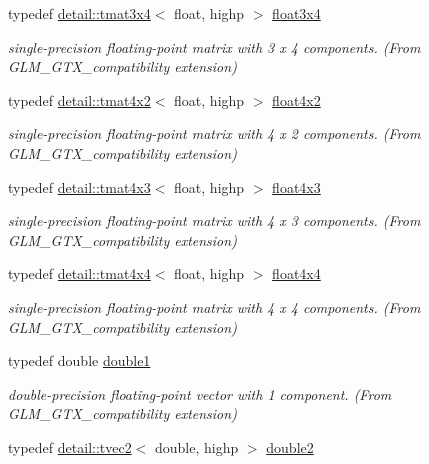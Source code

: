 \begin{DoxyCompactItemize}
typedef \hyperlink{structglm_1_1detail_1_1tmat3x4}{detail\+::tmat3x4}$<$ float, highp $>$ \hyperlink{group__gtx__compatibility_ga53eb75b08b92aa34886397150c983943}{float3x4}
\begin{DoxyCompactList}\small\item\em single-\/precision floating-\/point matrix with 3 x 4 components. (From G\+L\+M\+\_\+\+G\+T\+X\+\_\+compatibility extension) \end{DoxyCompactList}\item 
typedef \hyperlink{structglm_1_1detail_1_1tmat4x2}{detail\+::tmat4x2}$<$ float, highp $>$ \hyperlink{group__gtx__compatibility_gab805aa2d6bbd5edddf78bd2e9322e6c7}{float4x2}
\begin{DoxyCompactList}\small\item\em single-\/precision floating-\/point matrix with 4 x 2 components. (From G\+L\+M\+\_\+\+G\+T\+X\+\_\+compatibility extension) \end{DoxyCompactList}\item 
typedef \hyperlink{structglm_1_1detail_1_1tmat4x3}{detail\+::tmat4x3}$<$ float, highp $>$ \hyperlink{group__gtx__compatibility_ga72398a5d715031923beca8907c52f5d6}{float4x3}
\begin{DoxyCompactList}\small\item\em single-\/precision floating-\/point matrix with 4 x 3 components. (From G\+L\+M\+\_\+\+G\+T\+X\+\_\+compatibility extension) \end{DoxyCompactList}\item 
typedef \hyperlink{structglm_1_1detail_1_1tmat4x4}{detail\+::tmat4x4}$<$ float, highp $>$ \hyperlink{group__gtx__compatibility_ga1f48a19e35b3640cf3d509041f7a800b}{float4x4}
\begin{DoxyCompactList}\small\item\em single-\/precision floating-\/point matrix with 4 x 4 components. (From G\+L\+M\+\_\+\+G\+T\+X\+\_\+compatibility extension) \end{DoxyCompactList}\item 
typedef double \hyperlink{group__gtx__compatibility_gab8b88350212cea916857cb2f49b8a29f}{double1}
\begin{DoxyCompactList}\small\item\em double-\/precision floating-\/point vector with 1 component. (From G\+L\+M\+\_\+\+G\+T\+X\+\_\+compatibility extension) \end{DoxyCompactList}\item 
typedef \hyperlink{structglm_1_1detail_1_1tvec2}{detail\+::tvec2}$<$ double, highp $>$ \hyperlink{group__gtx__compatibility_ga227d30a4fa630c9e3fb6c7ea87250c62}{double2}

\end{DoxyCompactItemize}
